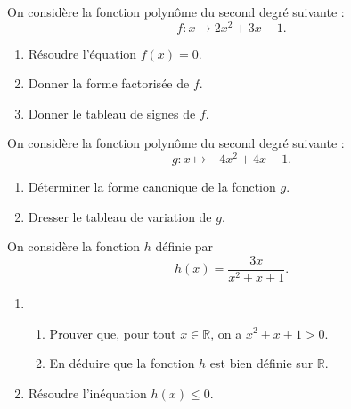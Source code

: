 \documentclass[11pt]{article}
\begin{document}
\begin{exo}[$4$ points]
  On considère la fonction polynôme du second degré suivante :
  \[
    f:x\mapsto 2x^2+3x-1.
  \]
  \begin{enumerate}
    \item Résoudre l'équation $f(x) = 0$.
    \item Donner la forme factorisée de $f$.
    \item Donner le tableau de signes de $f$.
  \end{enumerate}
\end{exo}

\begin{exo}[$2$ points]
  On considère la fonction polynôme du second degré suivante :
  \[
    g:x\mapsto -4x^2+4x-1.
  \]
  \begin{enumerate}
    \item Déterminer la forme canonique de la fonction $g$.
    \item Dresser le tableau de variation de $g$.
  \end{enumerate}
\end{exo}

\begin{exo}[$3$ points]
  On considère la fonction $h$ définie par
  \[
    h(x) = \frac{3x}{x^2+x+1}.
  \]
  \begin{enumerate}
    \item 
      \begin{enumerate}
        \item Prouver que, pour tout $x\in\mathbb{R}$, on a $x^2+x+1>0$.
        \item En déduire que la fonction $h$ est bien définie sur $\mathbb{R}$.
      \end{enumerate}
    \item Résoudre l'inéquation $h(x)\leq0$.
  \end{enumerate}
\end{exo}
\end{document}

